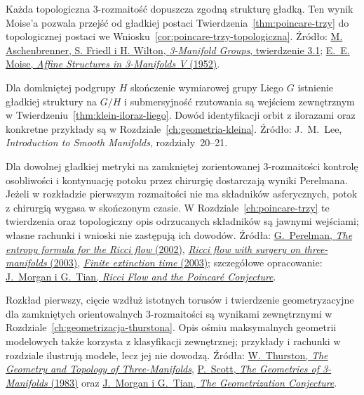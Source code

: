 \begin{description}[leftmargin=2.9cm,style=nextline]
\item[Wygładzanie rozmaitości trójwymiarowych.]
  Każda topologiczna $3$-rozmaitość dopuszcza
  zgodną strukturę gładką. Ten wynik Moise'a
  pozwala przejść od gładkiej postaci
  Twierdzenia~\ref{thm:poincare-trzy}
  do topologicznej postaci we
  Wniosku~\ref{cor:poincare-trzy-topologiczna}.
  Źródło: \href{https://msp.org/gtm/2015/19-1/gtm-v19-n1-p08-s.pdf}
  {M. Aschenbrenner, S. Friedl i H. Wilton,
  \emph{3-Manifold Groups}, twierdzenie 3.1};
  \href{https://doi.org/10.2307/1969769}
  {E.~E. Moise, \emph{Affine Structures in
  3-Manifolds V} (1952)}.

\item[Ilorazy grup Liego.]
  Dla domkniętej podgrupy $H$ skończenie wymiarowej
  grupy Liego $G$ istnienie gładkiej struktury na
  $G/H$ i submersyjność rzutowania są wejściem
  zewnętrznym w
  Twierdzeniu~\ref{thm:klein-iloraz-liego}.
  Dowód identyfikacji orbit z ilorazami oraz
  konkretne przykłady są w
  Rozdziale~\ref{ch:geometria-kleina}.
  Źródło: J.\ M.\ Lee, \emph{Introduction to Smooth
  Manifolds}, rozdziały~20--21.

\item[Potok Ricciego z chirurgią i wygaśnięcie.]
  Dla dowolnej gładkiej metryki na zamkniętej
  zorientowanej $3$-rozmaitości kontrolę osobliwości
  i kontynuację potoku przez chirurgię dostarczają
  wyniki Perelmana. Jeżeli w rozkładzie pierwszym
  rozmaitości nie ma składników asferycznych,
  potok z chirurgią wygasa w skończonym czasie.
  W Rozdziale~\ref{ch:poincare-trzy} te twierdzenia
  oraz topologiczny opis odrzucanych składników
  są jawnymi wejściami; własne rachunki i wnioski
  nie zastępują ich dowodów. Źródła:
  \href{https://arxiv.org/pdf/math/0211159}
  {G.\ Perelman, \emph{The entropy formula for the Ricci flow} (2002)},
  \href{https://arxiv.org/pdf/math/0303109}
  {\emph{Ricci flow with surgery on three-manifolds} (2003)},
  \href{https://arxiv.org/pdf/math/0307245}
  {\emph{Finite extinction time} (2003)};
  szczegółowe opracowanie:
  \href{https://www.claymath.org/wp-content/uploads/2022/03/Ricci-pdf.pdf}
  {J.\ Morgan i G.\ Tian, \emph{Ricci Flow and the Poincaré Conjecture}}.

\item[Geometryzacja rozmaitości trójwymiarowych.]
  Rozkład pierwszy, cięcie wzdłuż istotnych torusów
  i twierdzenie geometryzacyjne dla zamkniętych
  orientowalnych $3$-rozmaitości są wynikami zewnętrznymi
  w Rozdziale~\ref{ch:geometrizacja-thurstona}.
  Opis ośmiu maksymalnych geometrii modelowych także
  korzysta z klasyfikacji zewnętrznej; przykłady i rachunki
  w rozdziale ilustrują modele, lecz jej nie dowodzą.
  Źródła:
  \href{https://library.slmath.org/nonmsri/gt3m/PDF/Thurston-gt3m.pdf}
  {W.\ Thurston, \emph{The Geometry and Topology of Three-Manifolds}},
  \href{https://sschleimer.warwick.ac.uk/Teach/2021_3MFDS/References/1983the_geometries_of_three-manifolds.pdf}
  {P.\ Scott, \emph{The Geometries of 3-Manifolds} (1983)}
  oraz \href{https://www.claymath.org/wp-content/uploads/2022/03/Geom.pdf}
  {J.\ Morgan i G.\ Tian, \emph{The Geometrization Conjecture}}.


\end{description}

